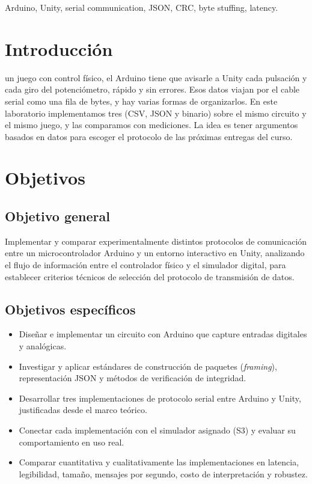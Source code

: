 \documentclass[journal]{IEEEtran}
\begin{document}
\renewcommand{\IEEEkeywordsname}{Keywords}
\begin{IEEEkeywords}
Arduino, Unity, serial communication, JSON, CRC, byte stuffing, latency.
\end{IEEEkeywords}

\section{Introducción}

 un juego con control físico, el Arduino tiene que avisarle a Unity cada pulsación y cada giro del potenciómetro, rápido y sin errores. Esos datos viajan por el cable serial como una fila de bytes, y hay varias formas de organizarlos. En este laboratorio implementamos tres (CSV, JSON y binario) sobre el mismo circuito y el mismo juego, y las comparamos con mediciones. La idea es tener argumentos basados en datos para escoger el protocolo de las próximas entregas del curso.

\section{Objetivos}

\subsection{Objetivo general}
Implementar y comparar experimentalmente distintos protocolos de comunicación entre un microcontrolador Arduino y un entorno interactivo en Unity, analizando el flujo de información entre el controlador físico y el simulador digital, para establecer criterios técnicos de selección del protocolo de transmisión de datos.

\subsection{Objetivos específicos}
\begin{itemize}
    \item Diseñar e implementar un circuito con Arduino que capture entradas digitales y analógicas.
    \item Investigar y aplicar estándares de construcción de paquetes (\emph{framing}), representación JSON y métodos de verificación de integridad.
    \item Desarrollar tres implementaciones de protocolo serial entre Arduino y Unity, justificadas desde el marco teórico.
    \item Conectar cada implementación con el simulador asignado (S3) y evaluar su comportamiento en uso real.
    \item Comparar cuantitativa y cualitativamente las implementaciones en latencia, legibilidad, tamaño, mensajes por segundo, costo de interpretación y robustez.
\end{itemize}
\end{document}
